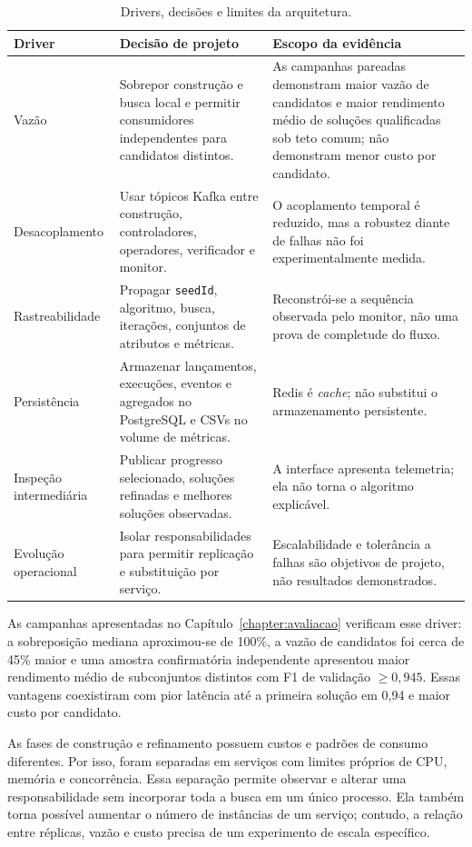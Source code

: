 \begin{table}[!htb]
  \centering
  \small
  \caption{Drivers, decisões e limites da arquitetura.}
  \label{tab:architecture-drivers}
  \begin{tabularx}{\linewidth}{@{}p{.18\linewidth}X X@{}}
    \toprule
    \textbf{Driver} & \textbf{Decisão de projeto} & \textbf{Escopo da evidência} \\
    \midrule
    Vazão & Sobrepor construção e busca local e permitir consumidores independentes para candidatos distintos. & As campanhas pareadas demonstram maior vazão de candidatos e maior rendimento médio de soluções qualificadas sob teto comum; não demonstram menor custo por candidato. \\
    Desacoplamento & Usar tópicos Kafka entre construção, controladores, operadores, verificador e monitor. & O acoplamento temporal é reduzido, mas a robustez diante de falhas não foi experimentalmente medida. \\
    Rastreabilidade & Propagar \texttt{seedId}, algoritmo, busca, iterações, conjuntos de atributos e métricas. & Reconstrói-se a sequência observada pelo monitor, não uma prova de completude do fluxo. \\
    Persistência & Armazenar lançamentos, execuções, eventos e agregados no PostgreSQL e CSVs no volume de métricas. & Redis é \textit{cache}; não substitui o armazenamento persistente. \\
    Inspeção intermediária & Publicar progresso selecionado, soluções refinadas e melhores soluções observadas. & A interface apresenta telemetria; ela não torna o algoritmo explicável. \\
    Evolução operacional & Isolar responsabilidades para permitir replicação e substituição por serviço. & Escalabilidade e tolerância a falhas são objetivos de projeto, não resultados demonstrados. \\
    \bottomrule
  \end{tabularx}
\end{table}


As campanhas apresentadas no Capítulo~\ref{chapter:avaliacao} verificam esse driver: a sobreposição mediana aproximou-se de 100\%, a vazão de candidatos foi cerca de 45\% maior e uma amostra confirmatória independente apresentou maior rendimento médio de subconjuntos distintos com F1 de validação $\geq 0{,}945$. Essas vantagens coexistiram com pior latência até a primeira solução em 0,94 e maior custo por candidato.

As fases de construção e refinamento possuem custos e padrões de consumo diferentes. Por isso, foram separadas em serviços com limites próprios de CPU, memória e concorrência. Essa separação permite observar e alterar uma responsabilidade sem incorporar toda a busca em um único processo. Ela também torna possível aumentar o número de instâncias de um serviço; contudo, a relação entre réplicas, vazão e custo precisa de um experimento de escala específico.

